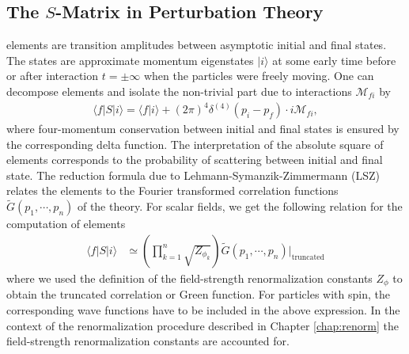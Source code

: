 \subsection{The $S$-Matrix in Perturbation Theory}
\label{sec:s-matr-pert}
\sma{} elements are transition amplitudes between asymptotic initial and final
states. The states are approximate momentum
eigenstates $|i\rangle$ at some early time before or after interaction
\mbox{$t = \pm\infty$} when the particles were freely moving. One can decompose \sma{} elements and isolate
the non-trivial part due to interactions $\mathcal{M}_{fi}$ by
\begin{align}
  \langle f | S | i \rangle =  \langle f | i \rangle + (2\pi)^4
  \delta^{(4)}(p_i- p_f) \cdot i \mathcal{M}_{fi},
\end{align}
where four-momentum conservation between initial and
final states is ensured by the corresponding delta function. The
interpretation of the absolute square of \sma{} elements corresponds
to the probability of scattering between initial and final state.
The reduction formula due to Lehmann-Symanzik-Zimmermann (LSZ)
\cite{Lehmann:1954rq} relates the \sma{} elements to the Fourier
transformed correlation functions $\widetilde{G}(p_1,\cdots,p_n)$ of the theory. For
scalar fields, we get the following relation for the computation of \sma{} elements
\begin{align}
 \langle f | S | i \rangle &\simeq 
 \left(\prod_{k=1}^n{\sqrt{Z_{\phi_k}}} \right)
\widetilde{G}(p_1,\cdots,p_n)\rvert_{\text{truncated}}
\end{align}
where we used the definition of the field-strength renormalization
constants $Z_{\phi}$ to obtain the truncated correlation or Green
function. For
particles with spin, the corresponding wave functions have to be
included in the above expression. In the context of the renormalization procedure described in
Chapter \ref{chap:renorm} the field-strength renormalization constants are accounted for.
